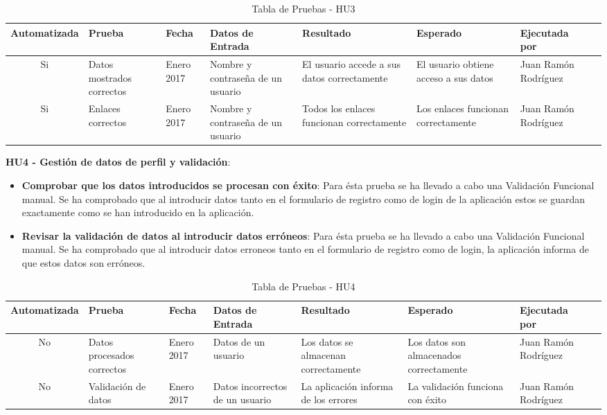 \documentclass[11pt,openany]{book}
\begin{document}
{\tiny
\setlength{\LTleft}{-20cm plus -1fill}
\setlength{\LTright}{\LTleft}
\begin{center}
\begin{longtable}{| c | M{1.5cm} | M{1.5cm} | M{2.5cm} | M{1.5cm} | M{1.5cm} | M{1.5cm} | M{1.5cm} |}
\caption[Tabla de Pruebas - HU3]{Tabla de Pruebas - HU3} \label{grid_mlmmh} \\

\hline Automatizada & Prueba & Fecha & Datos de Entrada & Resultado & Esperado & Ejecutada por \\
\endfirsthead
\hline
Si & Datos mostrados correctos & Enero 2017 & Nombre y contraseña de un usuario & El usuario accede a sus datos correctamente & El usuario obtiene acceso a sus datos & Juan Ramón Rodríguez \\
\hline
Si & Enlaces correctos & Enero 2017 & Nombre y contraseña de un usuario & Todos los enlaces funcionan correctamente & Los enlaces funcionan correctamente & Juan Ramón Rodríguez \\
\hline
\end{longtable}
\end{center}}
 
\textbf{HU4 - Gestión de datos de perfil y validación}:
 
\begin{itemize}
\item\textbf{Comprobar que los datos introducidos se procesan con éxito}: Para ésta prueba se ha llevado a cabo una Validación Funcional manual. Se ha comprobado que al introducir datos tanto en el formulario de registro como de login de la aplicación estos se guardan exactamente como se han introducido en la aplicación.
\item\textbf{Revisar la validación de datos al introducir datos erróneos}: Para ésta prueba se ha llevado a cabo una Validación Funcional manual. Se ha comprobado que al introducir datos erroneos tanto en el formulario de registro como de login, la aplicación informa de que estos datos son erróneos.
\end{itemize}

{\tiny
\setlength{\LTleft}{-20cm plus -1fill}
\setlength{\LTright}{\LTleft}
\begin{center}
\begin{longtable}{| c | M{1.5cm} | M{1.5cm} | M{2.5cm} | M{1.5cm} | M{1.5cm} | M{1.5cm} | M{1.5cm} |}
\caption[Tabla de Pruebas - HU4]{Tabla de Pruebas - HU4} \label{grid_mlmmh} \\

\hline Automatizada & Prueba & Fecha & Datos de Entrada & Resultado & Esperado & Ejecutada por \\
\endfirsthead
\hline
No & Datos procesados correctos & Enero 2017 & Datos de un usuario & Los datos se almacenan correctamente & Los datos son almacenados correctamente & Juan Ramón Rodríguez \\
\hline
No & Validación de datos & Enero 2017 & Datos incorrectos de un usuario & La aplicación informa de los errores & La validación funciona con éxito & Juan Ramón Rodríguez \\
\hline
\end{longtable}
\end{center}}
 
\end{document}

